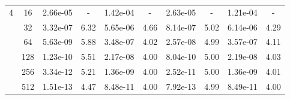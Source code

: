 \begin{table}[htbp]
\begin{center}
\begin{tabular}{| c | c | c c | c c | c c | c c |}
			4	& 16 & 2.66e-05 & - & 1.42e-04 & - & 2.63e-05 & - & 1.21e-04 & - \\
				& 32 & 3.32e-07 & 6.32 & 5.65e-06 & 4.66 & 8.14e-07 & 5.02 & 6.14e-06 & 4.29 \\
				& 64 & 5.63e-09 & 5.88 & 3.48e-07 & 4.02 & 2.57e-08 & 4.99 & 3.57e-07 & 4.11 \\
				& 128 & 1.23e-10 & 5.51 & 2.17e-08 & 4.00 & 8.04e-10 & 5.00 & 2.19e-08 & 4.03 \\
				& 256 & 3.34e-12 & 5.21 & 1.36e-09 & 4.00 & 2.52e-11 & 5.00 & 1.36e-09 & 4.01 \\
				& 512 & 1.51e-13 & 4.47 & 8.48e-11 & 4.00 & 7.92e-13 & 4.99 & 8.49e-11 & 4.00 \\

			\hline
		\end{tabular}
	\end{center}
\end{table}

